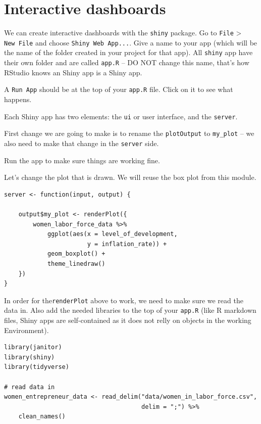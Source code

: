 \documentclass[
]{book}
\begin{document}
\hypertarget{interactive-dashboards}{%
\section{Interactive dashboards}\label{interactive-dashboards}}

We can create interactive dashboards with the \texttt{shiny} package. Go to \texttt{File} \textgreater{} \texttt{New\ File} and choose \texttt{Shiny\ Web\ App...}. Give a name to your app (which will be the name of the folder created in your project for that app). All \texttt{shiny} app have their own folder and are called \texttt{app.R} -- DO NOT change this name, that's how RStudio knows an Shiny app is a Shiny app.

A \texttt{Run\ App} should be at the top of your \texttt{app.R} file. Click on it to see what happens.

Each Shiny app has two elements: the \texttt{ui} or user interface, and the \texttt{server}.

First change we are going to make is to rename the \texttt{plotOutput} to \texttt{my\_plot} -- we also need to make that change in the \texttt{server} side.

Run the app to make sure things are working fine.

Let's change the plot that is drawn. We will reuse the box plot from this module.

\begin{verbatim}
server <- function(input, output) {

    output$my_plot <- renderPlot({
        women_labor_force_data %>%
            ggplot(aes(x = level_of_development,
                       y = inflation_rate)) +
            geom_boxplot() +
            theme_linedraw()
    })
}
\end{verbatim}

In order for the\texttt{renderPlot} above to work, we need to make sure we read the data in. Also add the needed libraries to the top of your \texttt{app.R} (like R markdown files, Shiny apps are self-contained as it does not relly on objects in the working Environment).

\begin{verbatim}
library(janitor)
library(shiny)
library(tidyverse)

# read data in
women_entrepreneur_data <- read_delim("data/women_in_labor_force.csv",
                                      delim = ";") %>%
    clean_names()
\end{verbatim}
\end{document}
